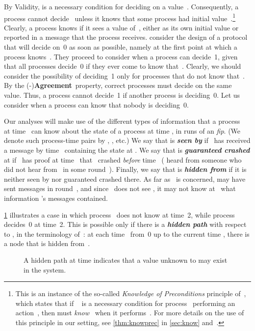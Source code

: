 \documentclass[11pt]{article}
\theoremstyle{definition}
\newcommand{\defemph}[1]{\textbf{\textit{#1}}}
\newcommand{\Agreement}{{\bf Agreement}}
\newcommand{\fip}{{\it fip}}
\begin{document}
By Validity,  is a necessary condition for deciding on a value~.
Consequently, a process cannot decide~ unless it knows that some process had initial value~.\footnote{This is an instance of the so-called {\em Knowledge of Preconditions} principle of~\cite{Moses-tark2015}, which states that if ~ is a necessary condition for process~ performing an action~, then  must {\em know}~ when it performs~. For more details on the use of this principle in our setting, see \cref{thm:knowprec} in \cref{sec:know}
and~\cite{AYY-DISC}.}
Clearly, a process knows  if it sees a value of~, either as its own initial value or reported in a message that the process receives. \cite{AYY-DISC} consider the design of a protocol that will decide on~0 as soon as possible, namely at the first point at which
a process
 knows~.
They proceed to consider when a process can decide~1, given that all processes
decide~0 if they ever come to know that~. Clearly, we should consider the possibility of deciding~1 only for processes that do not know that~.
By the (-)\Agreement\ property, correct processes must decide on the same value.
Thus, a process cannot decide~1 if another process is deciding~0. Let us consider when a process can know that nobody is deciding~0.

Our analyses will make use of the different types of information that a process~ at time~ can know about the state of a process  at time , in runs of an \fip. (We denote such process-time pairs by , , etc.) We say that  is \defemph{seen by} 
if~ has received a message by time~ containing the state at . We say that  is \defemph{guaranteed crashed} at  if~ has proof at time~ that~ crashed \emph{before} time~ ( heard from someone who did not hear from~ in some round~). Finally, we say that  is \defemph{hidden from}  if it is neither seen by  nor guaranteed crashed there.
As far as~ is concerned,  may have sent messages in round~, and since~ does not see , it may not know at~ what information 's messages contained.

\cref{fig-hidden-path} illustrates a case in which process~ does not know  at time~2, while process~ decides~0 at time~2. This is possible only if there is a \defemph{hidden path} with respect to ,  in the terminology of~\cite{AYY-DISC}: at each time~ from~0 up to the current time , there is a node  that is hidden from~.

\begin{figure}[t]
    \centering
        \qquad\qquad\qquad
        \vspace{-0.3cm}
        \caption{
            A hidden path at time  indicates that a value unknown to  may exist in the system.
        }
	\label{fig-hidden-path}
\end{figure}
\end{document}
